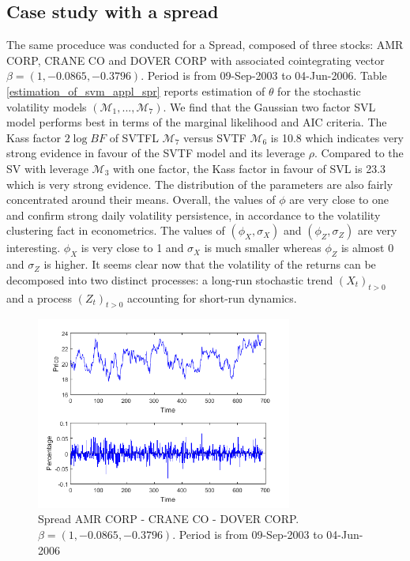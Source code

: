 \documentclass[11pt,a4,twosided,singlespacing,titlepagenumber=on]{scrreprt}
\numberwithin{equation}{chapter} %
\theoremstyle{remark}
\begin{document}

\subsection{Case study with a spread}

The same proceduce was conducted for a Spread, composed of three stocks: AMR CORP, CRANE CO and DOVER CORP with associated cointegrating vector $\beta = (1, -0.0865, -0.3796)$. Period is from 09-Sep-2003 to 04-Jun-2006. Table \ref{estimation_of_svm_appl_spr} reports estimation of $\theta$ for the stochastic volatility models $(\mathcal{M}_1, ..., \mathcal{M}_7)$. We find that the Gaussian two factor SVL model performs best in terms of the marginal likelihood and AIC criteria. The Kass factor $2 \log BF$ of SVTFL $\mathcal{M}_7$ versus SVTF $\mathcal{M}_6$ is 10.8 which indicates very strong evidence in favour of the SVTF model and its leverage $\rho$. Compared to the SV with leverage $\mathcal{M}_3$ with one factor, the Kass factor in favour of SVL is 23.3 which is very strong evidence. The distribution of the parameters are also fairly concentrated around their means. Overall, the values of $\phi$ are very close to one and confirm strong daily volatility persistence, in accordance to the volatility clustering fact in econometrics. The values of $(\phi_X, \sigma_X)$ and $(\phi_Z, \sigma_Z)$ are very interesting. $\phi_X$ is very close to 1 and $\sigma_X$ is much smaller whereas $\phi_Z$ is almost 0 and $\sigma_Z$ is higher. It seems clear now that the volatility of the returns can be decomposed into two distinct processes: a long-run stochastic trend $(X_t)_{t>0}$ and a process $(Z_t)_{t>0}$ accounting for short-run dynamics.

\begin{figure}[H]
\centering
\includegraphics[width = 0.75\textwidth]{spread_amr_crane_2003_2006}
\caption{Spread AMR CORP - CRANE CO - DOVER CORP. $\beta = (1, -0.0865, -0.3796)$. Period is from 09-Sep-2003 to 04-Jun-2006}
\label{spread_amr_crane_2003_2006}
\end{figure}
\end{document}
